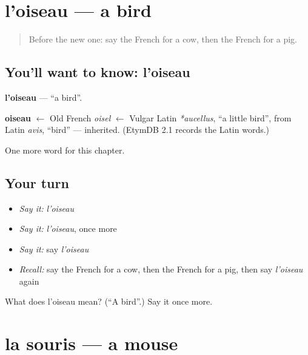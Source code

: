 \section[l'oiseau]{l'oiseau — a bird}

\label{lesson:FR-C85-oiseau}



\begin{quote}
Before the new one: say the French for a cow, then the French for a pig.
\end{quote}

\subsection*{You'll want to know: l'oiseau}
\textbf{l'oiseau} — \textquotedblleft{}a bird\textquotedblright{}.

\begin{cousinweb}
\textbf{oiseau} $\leftarrow$ Old French \emph{oisel} $\leftarrow$ Vulgar Latin \emph{*aucellus}, \textquotedblleft{}a little bird\textquotedblright{}, from Latin \emph{avis}, \textquotedblleft{}bird\textquotedblright{} — inherited. (EtymDB 2.1 records the Latin words.)
\end{cousinweb}

\begin{grammarlens}[title={What you've built}]
One more word for this chapter.
\end{grammarlens}

\subsection*{Your turn}
\begin{itemize}
\raggedright
  \item \emph{Say it:} \emph{l'oiseau}
  \item \emph{Say it:} \emph{l'oiseau}, once more
  \item \emph{Say it:} say \emph{l'oiseau}
  \item \emph{Recall:} say the French for a cow, then the French for a pig, then say \emph{l'oiseau} again
\end{itemize}

\begin{tcolorbox}[breakable,colback=teal!4,colframe=teal!35!black,title={Before you move on}]
What does l'oiseau mean? (\textquotedblleft{}A bird\textquotedblright{}.) Say it once more.
\end{tcolorbox}
\section[la souris]{la souris — a mouse}


